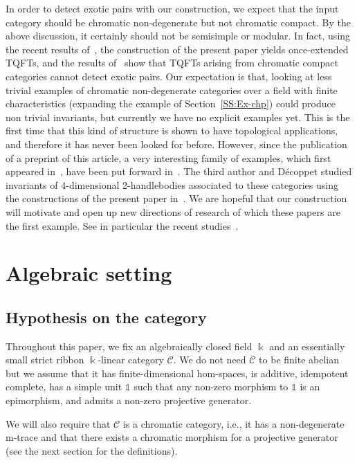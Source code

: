 \documentclass[10pt,a4paper]{amsart}
\numberwithin{equation}{section}
\numberwithin{theorem}{section}
\numberwithin{proposition}{section}
\numberwithin{definition}{section}
\numberwithin{lemma}{section}
\numberwithin{corollary}{section}
\numberwithin{remark}{section}
\numberwithin{example}{section}
\newcommand{\cat}{\mathcal{C}}
\newcommand{\unit}{\ensuremath{\mathds{1}}}
\newcommand{\FK}{{\Bbbk}}
\newcounter{exo} \newcounter{numexercice}
\begin{document}
In order to detect exotic pairs with our construction, we expect that the input category should be chromatic non-degenerate but not chromatic compact.
By the above discussion, it certainly should not be semisimple or modular.
In fact, using the recent results of~\cite{HaiounWRT}, the construction of the present paper yields once-extended TQFTs, and the results of~\cite{Reutter} show that TQFTs arising from chromatic compact categories cannot detect exotic pairs.
Our expectation is that, looking at less trivial examples of chromatic non-degenerate categories over a field with finite characteristics (expanding the example of Section~\ref{SS:Ex-chp}) could produce non trivial invariants, but currently we have no explicit examples yet.
This is the first time that this kind of structure is shown to have topological applications, and therefore it has never been looked for before. However, since the publication of a preprint of this article, a very interesting family of examples, which first appeared in~\cite{STWZ23}, have been put forward in~\cite{Decoppet}. The third author and D\'ecoppet studied invariants of 4-dimensional 2-handlebodies associated to these categories using the constructions of the present paper in~\cite{DH2HB}. We are hopeful that our construction will motivate and open up new directions of research of which these papers are the first example. See in particular the recent studies~\cite{FaesManko, Manko}.

\section{Algebraic setting}%
\subsection{Hypothesis on the category}\label{SS:Hypothesiscat}
Throughout this paper, we fix an algebraically closed field $\FK$ and
an essentially small strict ribbon $\FK$-linear
category $\cat$. We do not need $\cat$ to be finite abelian but we
assume that it has finite-dimensional hom-spaces, is additive,
idempotent complete, has a simple unit $\unit$ such that any non-zero
morphism to $\unit$ is an epimorphism, and admits a non-zero projective
generator.

We will also require that $\cat$ is a chromatic category, i.e., it has a
non-degenerate m-trace and that there exists a chromatic morphism for a projective generator (see the
next section for the definitions).
\end{document}
